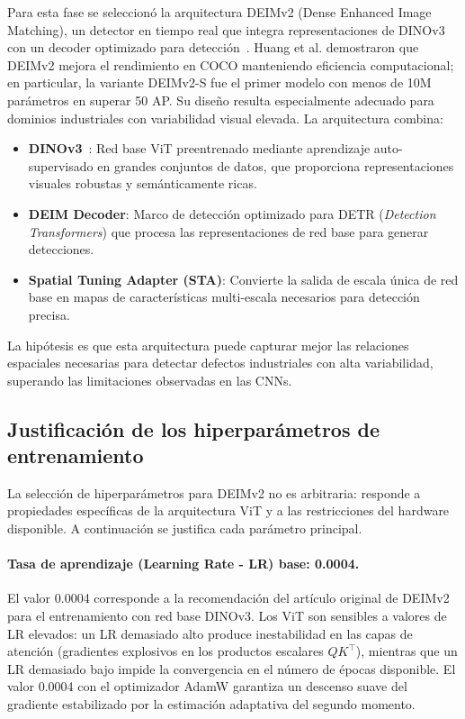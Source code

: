 Para esta fase se seleccionó la arquitectura DEIMv2 (Dense Enhanced Image Matching), un detector en tiempo real que integra representaciones de DINOv3 con un decoder optimizado para detección~\cite{huang2025deimv2}. Huang et al. demostraron que DEIMv2 mejora el rendimiento en COCO manteniendo eficiencia computacional; en particular, la variante DEIMv2-S fue el primer modelo con menos de 10M parámetros en superar 50 AP. Su diseño resulta especialmente adecuado para dominios industriales con variabilidad visual elevada. La arquitectura combina:
\begin{itemize}
    \item \textbf{DINOv3}~\cite{simeoni2025dinov3}: Red base \acrshort{ViT} preentrenado mediante aprendizaje auto-supervisado en grandes conjuntos de datos, que proporciona representaciones visuales robustas y semánticamente ricas.
    \item \textbf{DEIM Decoder}: Marco de detección optimizado para DETR (\textit{Detection Transformers}) que procesa las representaciones de red base para generar detecciones.
    \item \textbf{Spatial Tuning Adapter (STA)}: Convierte la salida de escala única de red base en mapas de características multi-escala necesarios para detección precisa.
\end{itemize}

La hipótesis es que esta arquitectura puede capturar mejor las relaciones espaciales necesarias para detectar defectos industriales con alta variabilidad, superando las limitaciones observadas en las CNNs.

\subsection{Justificación de los hiperparámetros de entrenamiento}
\label{subsec:justificacion_hiperparametros}

La selección de hiperparámetros para DEIMv2 no es arbitraria: responde a propiedades específicas de la arquitectura ViT y a las restricciones del hardware disponible. A continuación se justifica cada parámetro principal.

\paragraph{Tasa de aprendizaje (Learning Rate - LR) base: 0.0004.}
El valor 0.0004 corresponde a la recomendación del artículo original de DEIMv2~\cite{huang2025deimv2} para el entrenamiento con red base DINOv3. Los ViT son sensibles a valores de LR elevados: un LR demasiado alto produce inestabilidad en las capas de atención (gradientes explosivos en los productos escalares $QK^\top$), mientras que un LR demasiado bajo impide la convergencia en el número de épocas disponible. El valor 0.0004 con el optimizador AdamW garantiza un descenso suave del gradiente estabilizado por la estimación adaptativa del segundo momento.

